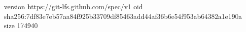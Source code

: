 version https://git-lfs.github.com/spec/v1
oid sha256:7df83e7eb57aa84f925b33709df85463add44af36b6e54f953ab64382a1e190a
size 174940
